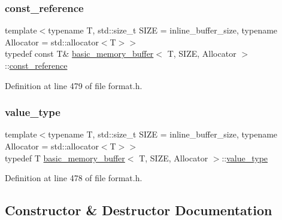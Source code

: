 \subsubsection{\texorpdfstring{const\+\_\+reference}{const\_reference}}
{\footnotesize\ttfamily template$<$typename T, std\+::size\+\_\+t S\+I\+ZE = inline\+\_\+buffer\+\_\+size, typename Allocator = std\+::allocator$<$\+T$>$$>$ \\
typedef const T\& \hyperlink{classbasic__memory__buffer}{basic\+\_\+memory\+\_\+buffer}$<$ T, S\+I\+ZE, Allocator $>$\+::\hyperlink{classinternal_1_1basic__buffer_adf277d724f8082f015258414ab206743}{const\+\_\+reference}}



Definition at line 479 of file format.\+h.

\mbox{\label{classbasic__memory__buffer_a6fa8bfb99b3da095c3849c91b0741f73}} 
\subsubsection{\texorpdfstring{value\+\_\+type}{value\_type}}
{\footnotesize\ttfamily template$<$typename T, std\+::size\+\_\+t S\+I\+ZE = inline\+\_\+buffer\+\_\+size, typename Allocator = std\+::allocator$<$\+T$>$$>$ \\
typedef T \hyperlink{classbasic__memory__buffer}{basic\+\_\+memory\+\_\+buffer}$<$ T, S\+I\+ZE, Allocator $>$\+::\hyperlink{classinternal_1_1basic__buffer_aae8a0f184091f512efbde04b2ba1ddd7}{value\+\_\+type}}



Definition at line 478 of file format.\+h.



\subsection{Constructor \& Destructor Documentation}
\mbox{\label{classbasic__memory__buffer_af6f3373ae1ecc2104f3074fadccb3c28}} 
